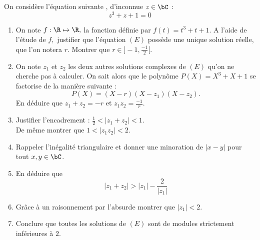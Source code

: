 \documentclass[a4paper, 11pt,reqno]{article}
\begin{document}
\begin{exercice}


On considère l'équation suivante , d'inconnue $z\in \bC$ : 
\begin{equation}\tag{$E$}
z^3 +z+1=0
\end{equation} 



\begin{enumerate}
\item On note $f : \R\mapsto \R, $ la fonction définie par $f(t) = t^3+t+1.$
A l'aide de l'étude de $f,$ justifier que l'équation $(E)$ possède une unique solution réelle, que l'on notera $r$. Montrer que $r \in ]-1, \frac{-1}{2}[$.
\item On note $z_1$ et $z_2$ les deux autres solutions complexes de $(E)$ qu'on ne cherche pas à calculer. On sait alors que le polynôme $P(X) = X^3+X+1$ se factorise de la manière suivante : 
$$P(X)  = (X-r)(X-z_1) (X-z_2).$$
En déduire que $z_1+z_2=-r$ et $z_1z_2=\frac{-1}{r}$.
\item Justifier l'encadrement  : $\frac{1}{2}<|z_1+z_2 |<1.$\\
De même montrer que  $1< |z_1z_2|< 2.$
\item Rappeler l'inégalité triangulaire et donner une minoration de $|x-y|$ pour tout $x,y\in \bC$. 

\item En déduire que $$|z_1+z_2| >|z_1| -\frac{2}{|z_1|}$$

\item Grâce à un raisonnement par l'absurde montrer que $|z_1|<2$.



\item Conclure que toutes les solutions de $(E)$ sont de modules strictement inférieures à $2$. 

%
%
%

\end{enumerate}

\end{exercice}
\end{document}

